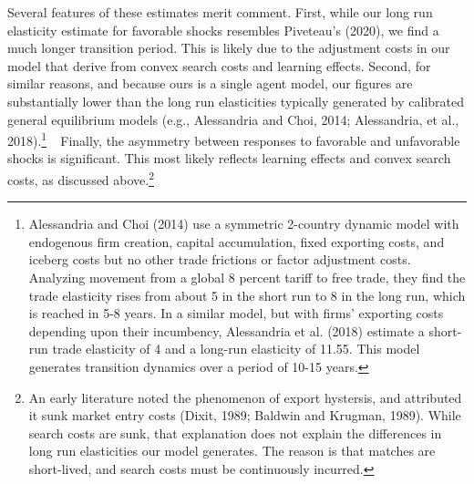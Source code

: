 \documentclass[12pt]{article}
\begin{document}
Several features of these estimates merit comment. First, while our long run
elasticity estimate for favorable shocks resembles Piveteau's (2020), we
find a much longer transition period. This is likely due to the adjustment
costs in our model that derive from convex search costs and learning
effects. Second, for similar reasons, and because ours is a single agent
model, our figures are substantially lower than the long run elasticities
typically generated by calibrated general equilibrium models (e.g.,
Alessandria and Choi, 2014;  Alessandria, et al., 2018).\footnote{%
Alessandria and Choi (2014) use a symmetric 2-country dynamic model with
endogenous firm creation, capital accumulation, fixed exporting costs, and
iceberg costs but no other trade frictions or factor adjustment costs.
Analyzing movement from a global 8 percent tariff to free trade, they find
the trade elasticity rises from about 5 in the short run to 8 in the long
run, which is reached in 5-8 years. In a similar model, but with firms'
exporting costs depending upon their incumbency, Alessandria et al. (2018)
estimate a short-run trade elasticity of 4 and a long-run elasticity of
11.55. This model generates transition dynamics over a period of 10-15 years.%
}\textbf{\ }\ Finally, the asymmetry between responses to favorable and
unfavorable shocks is significant. This most likely reflects learning
effects and convex search costs, as discussed above.\footnote{%
An early literature noted the phenomenon of export hystersis, and attributed
it sunk market entry costs (Dixit, 1989; Baldwin and Krugman, 1989). While
search costs are sunk, that explanation does not explain the differences in
long run elasticities our model generates. The reason is that matches are
short-lived, and search costs must be continuously incurred.}  
\end{document}
